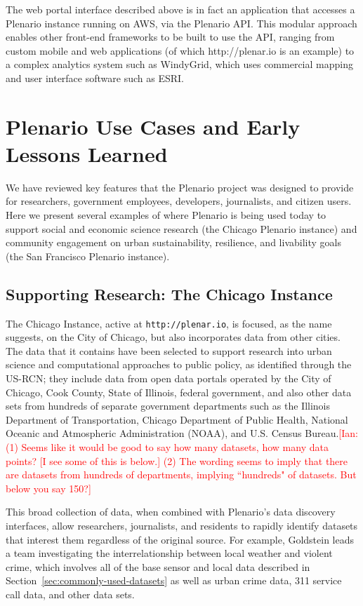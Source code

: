 \documentclass[11pt]{article}
\newcommand{\ian}[1]{\textcolor{Red}{[Ian: #1]}}
\newcommand{\ian}[1]{}
\begin{document}
The web portal interface described above is in fact an application that accesses a Plenario instance running on AWS, via the Plenario API. This modular approach enables other front-end frameworks to be built to use the API, ranging from custom mobile and web applications (of which http://plenar.io is an example) to a complex analytics system such as WindyGrid, which uses commercial mapping and user interface software such as ESRI.

\section{Plenario Use Cases and Early Lessons Learned}
We have reviewed key features that the Plenario project was designed to provide for researchers, government employees, developers, journalists, and citizen users. Here we present several examples of where Plenario is being used today to support social and economic science research (the Chicago Plenario instance) and community engagement on urban sustainability, resilience, and livability goals (the San Francisco Plenario instance). 

\subsection{\textbf{Supporting Research: The Chicago Instance}}\label{chicago-instance}
The Chicago Instance, active at {\tt http://plenar.io}, is focused, as the name suggests, on the City of Chicago, but also incorporates data from other cities. 
The data that it contains have been selected to support research into urban science and computational approaches to public policy, as identified through the US-RCN;
they include data from open data portals operated by the City of Chicago, Cook County, State of Illinois, federal government, and also other data sets from hundreds of separate government departments such as the Illinois Department of Transportation, Chicago Department of Public Health, National Oceanic and Atmospheric Administration (NOAA), and U.S. Census Bureau.\ian{(1) Seems like it would be good to say how many datasets, how many data points? [I see some of this is below.] (2) The wording seems to imply that there are datasets from hundreds of departments, implying ``hundreds" of datasets. But below you say 150?}

This broad collection of data, when combined with Plenario's data discovery interfaces, allow researchers, journalists, and residents to rapidly identify datasets that interest them regardless of the original source. For example, Goldstein leads a team investigating the interrelationship between local weather and violent crime, which involves all of the base sensor and local data described in Section~\ref{sec:commonly-used-datasets} as well as urban crime data, 311 service call data, and other data sets.
\end{document}

